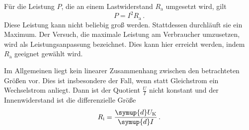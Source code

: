 Für die Leistung $P$, die an einem Lastwiderstand $R_\text{a}$ umgesetzt wird,
gilt
\begin{equation}
  P = I^2 R_\text{a}\,.
  \label{eqn:leistung}
\end{equation}
Diese Leistung kann nicht beliebig groß werden. Stattdessen durchläuft sie ein
Maximum. Der Versuch, die maximale Leistung am Verbraucher umzusetzen, wird als
Leistungsanpassung bezeichnet. Dies kann hier erreicht werden, indem $R_\text{a}$
geeignet gewählt wird.

Im Allgemeinen liegt kein linearer Zusammenhang zwischen den betrachteten Größen vor.
Dies ist insbesondere der Fall, wenn statt Gleichstrom ein Wechselstrom anliegt.
Dann ist der Quotient $\frac{U}{I}$ nicht konstant und der Innenwiderstand ist
die differenzielle Größe
\begin{equation}
  R_\text{i} = \frac{\symup{d} U_\text{K}}{\symup{d} I}\,.
\end{equation}
